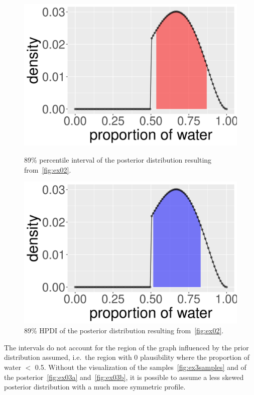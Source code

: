 \documentclass[article]{memoir}
\begin{document}
\begin{figure}[!ht]
\begin{minipage}[b]{0.42\linewidth}
\begin{center}
  \includegraphics[width=1\textwidth]{figs/ex03percentile.png}
\end{center}
\caption{89\% percentile interval of the posterior distribution resulting from~\autoref{fig:ex02}.}\label{fig:ex03a}
\end{minipage}
\hspace{0.1\linewidth}
\begin{minipage}[b]{0.42\linewidth}
\begin{center}
  \includegraphics[width=1\textwidth]{figs/ex03hpdi.png}
\end{center}
\caption{89\% HPDI of the posterior distribution resulting from~\autoref{fig:ex02}.}\label{fig:ex03b}
\end{minipage}
\end{figure}


The intervals do not account for the region of the graph influenced by the prior distribution assumed, i.e.\ the region with 0 plausibility where the proportion of water $<$ 0.5. Without the visualization of the samples~\autoref{fig:ex3samples} and of the posterior~\autoref{fig:ex03a} and~\autoref{fig:ex03b}, it is possible to assume a less skewed posterior distribution with a much more symmetric profile.
\end{document}
